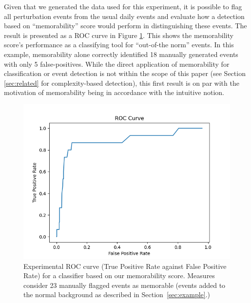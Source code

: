 \documentclass[entropy,article,submit,moreauthors,pdftex]{Definitions/mdpi}
\begin{document}
Given that we generated the data used for this experiment, it is possible to
flag all perturbation events from the usual daily events and evaluate how a
detection based on ``memorability'' score would perform in distinguishing these
events. The result is presented as a ROC curve in Figure \ref{fig:roc}. This shows the memorability score's performance as a classifying tool for ``out-of-the norm'' events. In this example, memorability alone correctly identified 18 manually generated events with only 5 false-positives. While the direct application of memorability for classification or event detection is not within the scope of this paper (see Section \ref{sec:related} for complexity-based detection), this first result is on par with the motivation of memorability being in accordance with the intuitive notion.

\begin{figure}[ht]
    \centering
    \includegraphics[width=0.7\linewidth]{./figures/roc}
    \caption{Experimental ROC curve (True Positive Rate against False Positive
        Rate) for a classifier based on our memorability score. Measures consider 23
        manually flagged events as memorable (events added to the normal background
        as described in Section~\ref{sec:example}.)}
    \label{fig:roc}
\end{figure}


\end{document}
